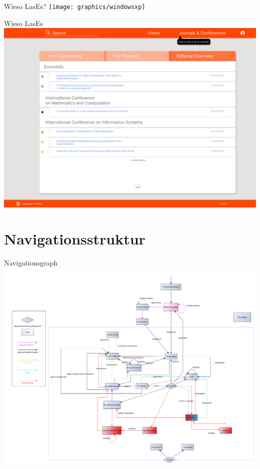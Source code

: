 \documentclass{beamer}
\begin{document}
    \begin{frame}{Wieso LasEs?}
        \centering
        \texttt{[image: graphics/windowsxp]}
    \end{frame}

    \begin{frame}{Wieso LasEs}
        \centering
        \includegraphics[height=0.75\textheight]{../../docs/Pflichtenheft/graphics/Homepage-png}
    \end{frame}

    \section{Navigationsstruktur}
    \begin{frame}{Navigationsgraph}
        \centering
        \includegraphics[height=0.8\textheight]{../../docs/Pflichtenheft/graphics/benutzerFlussyEd-png}
    \end{frame}
\end{document}
